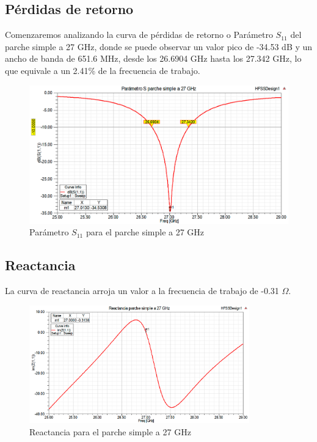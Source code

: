\subsection{Pérdidas de retorno}
\par Comenzaremos analizando la curva de pérdidas de retorno o Parámetro $S_{11}$ del parche simple a 27 GHz, donde se puede observar un valor pico de -34.53 dB y un ancho de banda de 651.6 MHz, desde los 26.6904 GHz hasta los 27.342 GHz, lo que equivale a un 2.41\% de la frecuencia de trabajo.
\\
\begin{figure}[H]
    \centering
        \includegraphics[width=\textwidth]{archivos/analisis/1x13/1}
        \caption{Parámetro $S_{11}$ para el parche simple a 27 GHz}
        \label{fig:s1x13}
\end{figure}

\subsection{Reactancia}
\par La curva de reactancia arroja un valor a la frecuencia de trabajo de -0.31 $\Omega$.
\\
\begin{figure}[H]
    \centering
        \includegraphics[width=0.85\textwidth]{archivos/analisis/1x13/2}
        \caption{Reactancia para el parche simple a 27 GHz}
        \label{fig:react1x13}
\end{figure}


